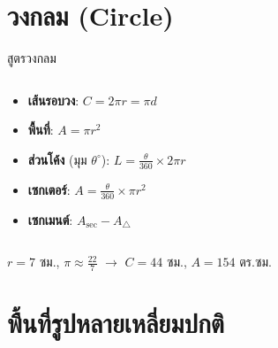 \documentclass[11pt, aspectratio=169]{beamer}
\begin{document}
\section{วงกลม (Circle)}

\begin{frame}{สูตรวงกลม}
  \begin{columns}[T]
      \centering

      \begin{explanation}[สูตร]
        \begin{itemize}
          \item \textbf{เส้นรอบวง}: $C = 2\pi r = \pi d$
          \item \textbf{พื้นที่}: $A = \pi r^2$
          \item \textbf{ส่วนโค้ง} (มุม $\theta^\circ$): $L = \frac{\theta}{360} \times 2\pi r$
          \item \textbf{เซกเตอร์}: $A = \frac{\theta}{360} \times \pi r^2$
          \item \textbf{เซกเมนต์}: $A_{\text{sec}} - A_{\triangle}$
        \end{itemize}
      \end{explanation}
  \end{columns}

  \begin{exambox}[ตัวอย่าง]
    $r = 7$ ซม., $\pi \approx \frac{22}{7}$ \quad $\rightarrow$ \quad $C = 44$ ซม., $A = 154$ ตร.ซม.
  \end{exambox}
\end{frame}

\section{พื้นที่รูปหลายเหลี่ยมปกติ}
\end{document}
